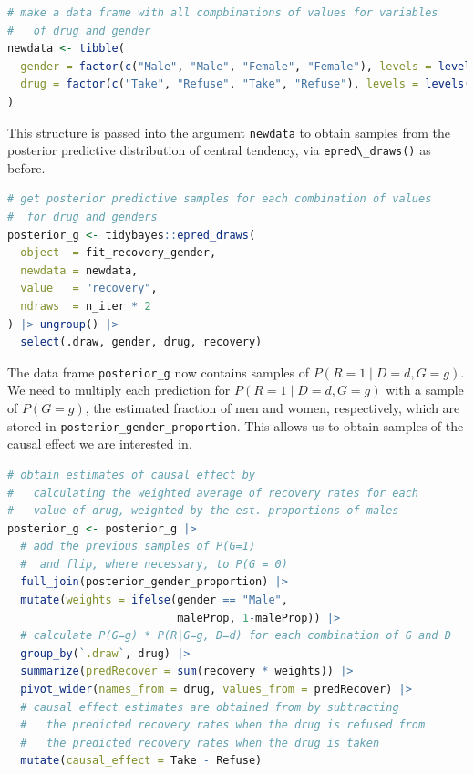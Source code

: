 \documentclass[nobib]{tufte-handout}
\newcommand{\ri}[1]{\mbox{\lstinline{#1}}\xspace}  %
\begin{document}
\begin{minipage}[]{\textwidth}
\begin{lstlisting}[language=R]
# make a data frame with all compbinations of values for variables
#   of drug and gender
newdata <- tibble(
  gender = factor(c("Male", "Male", "Female", "Female"), levels = levels(data_SP_long$gender)),
  drug = factor(c("Take", "Refuse", "Take", "Refuse"), levels = levels(data_SP_long$drug))
)
\end{lstlisting}
\end{minipage}

\vspace{-0.5cm}
This structure is passed into the argument \ri{newdata} to obtain samples from the posterior predictive distribution of central tendency, via \ri{epred\_draws()} as before.

\begin{minipage}[]{\textwidth}
\begin{lstlisting}[language=R]
# get posterior predictive samples for each combination of values
#  for drug and genders
posterior_g <- tidybayes::epred_draws(
  object  = fit_recovery_gender,
  newdata = newdata,
  value   = "recovery",
  ndraws  = n_iter * 2
) |> ungroup() |>
  select(.draw, gender, drug, recovery)
\end{lstlisting}
\end{minipage}

\vspace{-0.5cm}
The data frame \ri{posterior_g} now contains samples of $P(R=1 \mid D=d, G=g)$.
We need to multiply each prediction for $P(R=1 \mid D=d, G=g)$ with a sample of $P(G=g)$, the estimated fraction of men and women, respectively, which are stored in \ri{posterior_gender_proportion}.
This allows us to obtain samples of the causal effect we are interested in.

\begin{minipage}[]{\textwidth}
\begin{lstlisting}[language=R]
# obtain estimates of causal effect by
#   calculating the weighted average of recovery rates for each
#   value of drug, weighted by the est. proportions of males
posterior_g <- posterior_g |>
  # add the previous samples of P(G=1)
  #  and flip, where necessary, to P(G = 0)
  full_join(posterior_gender_proportion) |>
  mutate(weights = ifelse(gender == "Male",
                          maleProp, 1-maleProp)) |>
  # calculate P(G=g) * P(R|G=g, D=d) for each combination of G and D
  group_by(`.draw`, drug) |>
  summarize(predRecover = sum(recovery * weights)) |>
  pivot_wider(names_from = drug, values_from = predRecover) |>
  # causal effect estimates are obtained from by subtracting
  #   the predicted recovery rates when the drug is refused from
  #   the predicted recovery rates when the drug is taken
  mutate(causal_effect = Take - Refuse)
\end{lstlisting}
\end{minipage}
\end{document}
